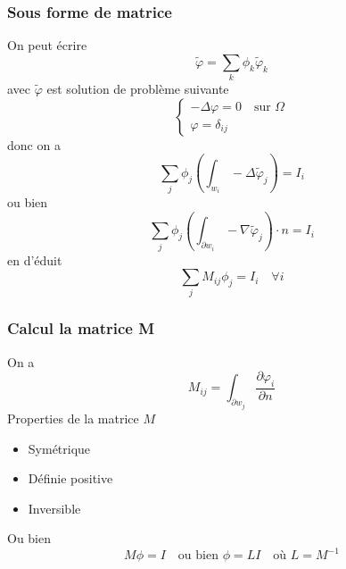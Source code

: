 \begin{frame}
\frametitle{Sous forme de matrice}
On peut \'ecrire
 \begin{equation}
 \tilde\varphi = \sum_k \phi_k \tilde{\varphi}_k
 \end{equation}
 avec $\tilde{\varphi}$ est solution de probl\`eme suivante 
 \begin{equation}
 \begin{cases}
 -\Delta{\varphi} = 0 \quad \text{sur } \Omega \\
 {\varphi} = \delta_{ij} 
 \end{cases}
 \end{equation}
 donc on a
 \begin{equation}
 \sum_j \phi_j \left( \int_{w_i}-\Delta\tilde{\varphi}_j \right) =I_i
 \end{equation}
 ou bien
 \begin{equation}
  \sum_j \phi_j \left( \int_{\partial w_i}-\nabla\tilde{\varphi}_j \right) \cdot n =I_i
 \end{equation}
 en d'\'eduit
  \begin{equation}
  \sum_j M_{ij}\phi_j =I_i \quad \forall i 
 \end{equation}
%


\end{frame} 

 \begin{frame}
\frametitle{Calcul la matrice M}
On a
\begin{equation}
  M_{ij} = \int_{\partial w_j} \frac{\partial\varphi_i}{\partial n}
\end{equation}
 Properties de la matrice $M$
 \begin{itemize}
 \item Sym\'etrique 
 \item D\'efinie positive
 \item Inversible
 \end{itemize}
 Ou bien
\begin{equation}
  M\phi =I \quad \text{ou bien } \phi =LI \quad \text{o\`u } L=M^{-1} 
\end{equation}


\end{frame} 

